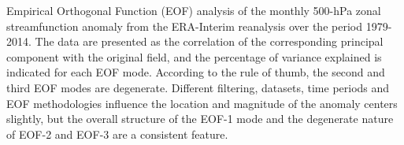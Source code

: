 \label{fig:eof}
Empirical Orthogonal Function (EOF) analysis of the monthly 500-hPa zonal streamfunction anomaly from the ERA-Interim reanalysis over the period 1979-2014. The data are presented as the correlation of the corresponding principal component with the original field, and the percentage of variance explained is indicated for each EOF mode. According to the \citet{North1982} rule of thumb, the second and third EOF modes are degenerate. Different filtering, datasets, time periods and EOF methodologies influence the location and magnitude of the anomaly centers slightly, but the overall structure of the EOF-1 mode and the degenerate nature of EOF-2 and EOF-3 are a consistent feature.  